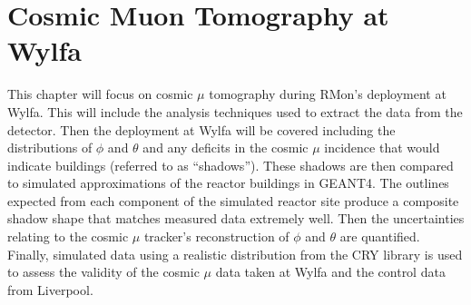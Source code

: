 
\chapter{Cosmic Muon Tomography at Wylfa}\label{chp:cosmicMuonTomography}

\ifpdf
    \graphicspath{{Chapter5/Figs/Raster/}{Chapter5/Figs/PDF/}{Chapter5/Figs/}}
\else
    \graphicspath{{Chapter5/Figs/Vector/}{Chapter5/Figs/}}
\fi

This chapter will focus on cosmic $\mu$ tomography during RMon's deployment at Wylfa. This will include the analysis techniques used to extract the data from the detector. Then the deployment at Wylfa will be covered including the distributions of $\phi$ and $\theta$ and any deficits in the cosmic $\mu$ incidence that would indicate buildings (referred to as ``shadows''). These shadows are then compared to simulated approximations of the reactor buildings in GEANT4. The outlines expected from each component of the simulated reactor site produce a composite shadow shape that matches measured data extremely well. Then the uncertainties relating to the cosmic $\mu$ tracker's reconstruction of $\phi$ and $\theta$ are quantified. Finally, simulated data using a realistic distribution from the CRY library is used to assess the validity of the cosmic $\mu$ data taken at Wylfa and the control data from Liverpool. 

